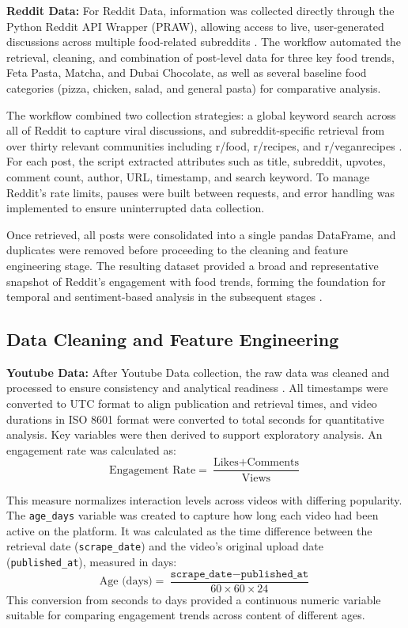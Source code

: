 \documentclass{article}
\begin{document}
\textbf{Reddit Data: }For Reddit Data, information was collected directly through the Python Reddit API Wrapper (PRAW), allowing access to live, user-generated discussions across multiple food-related subreddits \citep{reddit_api_praw}. The workflow automated the retrieval, cleaning, and combination of post-level data for three key food trends, Feta Pasta, Matcha, and Dubai Chocolate, as well as several baseline food categories (pizza, chicken, salad, and general pasta) for comparative analysis. 

The workflow combined two collection strategies: a global keyword search across all of Reddit to capture viral discussions, and subreddit-specific retrieval from over thirty relevant communities including r/food, r/recipes, and r/veganrecipes \citep{reddit_api_praw}. For each post, the script extracted attributes such as title, subreddit, upvotes, comment count, author, URL, timestamp, and search keyword. To manage Reddit’s rate limits, pauses were built between requests, and error handling was implemented to ensure uninterrupted data collection.

Once retrieved, all posts were consolidated into a single pandas DataFrame, and duplicates were removed before proceeding to the cleaning and feature engineering stage. The resulting dataset provided a broad and representative snapshot of Reddit’s engagement with food trends, forming the foundation for temporal and sentiment-based analysis in the subsequent stages \citep{reddit_api_praw}.


\subsection{Data Cleaning and Feature Engineering}
\textbf{Youtube Data: }After Youtube Data collection, the raw data was cleaned and processed to ensure consistency and analytical readiness \citep{youtube_api}. All timestamps were converted to UTC format to align publication and retrieval times, and video durations in ISO 8601 format were converted to total seconds for quantitative analysis. Key variables were then derived to support exploratory analysis. An engagement rate was calculated as:
\[
\text{Engagement Rate} = \frac{\text{Likes} + \text{Comments}}{\text{Views}}
\]

This measure normalizes interaction levels across videos with differing popularity. The \texttt{age\_days} variable was created to capture how long each video had been active on the platform. It was calculated as the time difference between the retrieval date (\texttt{scrape\_date}) and the video’s original upload date (\texttt{published\_at}), measured in days:
\[
\text{Age (days)} = \frac{\texttt{scrape\_date} - \texttt{published\_at}}{60 \times 60 \times 24}
\]
This conversion from seconds to days provided a continuous numeric variable suitable for comparing engagement trends across content of different ages.
\end{document}
